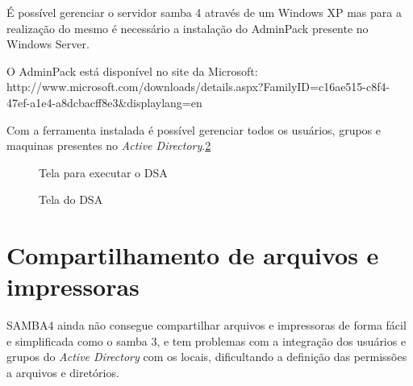 É possível gerenciar o servidor samba 4 através de um Windows XP mas para a realização do mesmo é necessário a instalação do AdminPack presente no Windows Server.

O AdminPack está disponível no site da Microsoft:  http://www.microsoft.com/downloads/details.aspx?FamilyID=c16ae515-c8f4-47ef-a1e4-a8dcbacff8e3\&displaylang=en 

Com a ferramenta instalada é possível gerenciar todos os usuários, grupos e maquinas presentes no \textit{Active Directory}.\ref{tela_dsa}

\begin{figure}[ht]
   	\centering
   	\caption{Tela para executar o DSA}
    \label{dsa}
\end{figure}

\begin{figure}[ht]
   	\centering
   	\caption{Tela do DSA}
    \label{tela_dsa}
\end{figure}


\section{Compartilhamento de arquivos e impressoras}

SAMBA4 ainda não consegue compartilhar arquivos e impressoras de forma fácil e simplificada como o samba 3, e tem problemas com a integração dos usuários e grupos do \textit{Active Directory} com os locais, dificultando a definição das permissões a arquivos e diretórios.


